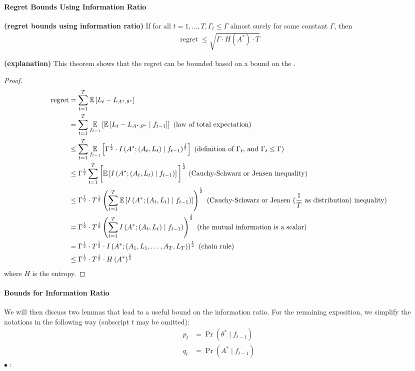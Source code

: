 \documentclass{article}
\newcommand{\bfs}[1]{\textbf{({#1}) }}
\newcommand{\re}{\operatorname{regret}}
\begin{document}
\paragraph{Regret Bounds Using Information Ratio}
\begin{thma}\bfs{regret bounds using information ratio}\label{thm:hdafrw}
If for all $t=1, \ldots, T, \Gamma_{t} \leq \Gamma$ almost surely for some constant $\Gamma$, then
\begin{align*}
\re \leq \sqrt{\Gamma \cdot H\left(A^{*}\right) \cdot T}
\end{align*}
\end{thma}
\begin{rema}\bfs{explanation}
This theorem shows that the regret can be bounded based on a bound on the . 
\end{rema}
\begin{proof}
\begin{align*}
\re &=\sum_{t=1}^{T} \mathbb{E}\left[L_{t}-L_{A^{*}, \theta^{*}}\right]\nn
&=\sum_{t=1}^{T} \underset{f_{t-1}}{\mathbb{E}}\left[\mathbb{E}\left[L_{t}-L_{A^{*}, \theta^{*}} \mid f_{t-1}\right]\right] \text { (law of total expectation) }\nn
& \leq \sum_{t=1}^{T} \underset{f_{t-1}}{\mathbb{E}}\left[\Gamma^{\frac{1}{2}} \cdot I\left(A^{*} ;\left(A_{t}, L_{t}\right) \mid f_{t-1}\right)^{\frac{1}{2}}\right]\text { (definition of  $\Gamma_{t}$, and  $\Gamma_{t} \leq \Gamma$)}\nn
& \leq \Gamma^{\frac{1}{2}} \sum_{t=1}^{T}\bigg[\mathbb{E}\left[I\left(A^{*} ;\left(A_{t}, L_{t}\right) \mid f_{t-1}\right)\right]\bigg]^{\frac{1}{2}}\text { (Cauchy-Schwarz or Jensen inequality)}\nn
& \leq \Gamma^{\frac{1}{2}} \cdot T^{\frac{1}{2}}\left(\sum_{t=1}^{T} \mathbb{E}\left[I\left(A^{*} ;\left(A_{t}, L_{t}\right) \mid f_{t-1}\right)\right]\right)^{\frac{1}{2}} \text { (Cauchy-Schwarz or Jensen ($\frac{1}{T}$ as distribution) inequality)}\\
&=\Gamma^{\frac{1}{2}} \cdot T^{\frac{1}{2}}\left(\sum_{t=1}^{T} I\left(A^{*} ;\left(A_{t}, L_{t}\right) \mid f_{t-1}\right)\right)^{\frac{1}{2}} \text { (the mutual information is a scalar) }\nn
&=\Gamma^{\frac{1}{2}} \cdot T^{\frac{1}{2}} \cdot I\left(A^{*} ;\left(A_{1}, L_{1}, \ldots, A_{T}, L_{T}\right)\right)^{\frac{1}{2}} \text { (chain rule) }\nn
&\leq \Gamma^{\frac{1}{2}} \cdot T^{\frac{1}{2}} \cdot H\left(A^{*}\right)^{\frac{1}{2}}
\end{align*}
where $H$ is the entropy.
\end{proof}
\paragraph{Bounds for Information Ratio}
We will then discuss two lemmas that lead to a useful bound on the information ratio. For the remaining exposition, we simplify the notations in the following way (subscript $t$ may be omitted): 
\begin{align*}
    p_{t}&=\operatorname{Pr}(\theta^{*} \mid f_{t-1})\\
     q_{t}&=\operatorname{Pr}(A^{*} \mid f_{t-1})
\end{align*}
$\bullet$ :
\end{document}
